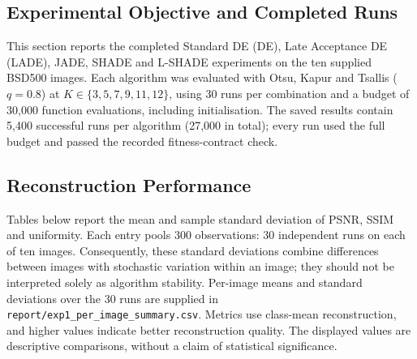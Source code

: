 \documentclass[review]{elsarticle}
\begin{document}
\label{sec:experiment1}

\subsection{Experimental Objective and Completed Runs}

This section reports the completed Standard DE (DE), Late Acceptance DE (LADE), JADE, SHADE and L-SHADE experiments on the ten supplied BSD500 images. Each algorithm was evaluated with Otsu, Kapur and Tsallis ($q=0.8$) at $K\in\{3,5,7,9,11,12\}$, using 30 runs per combination and a budget of 30,000 function evaluations, including initialisation. The saved results contain 5,400 successful runs per algorithm (27,000 in total); every run used the full budget and passed the recorded fitness-contract check.

\subsection{Reconstruction Performance}

Tables below report the mean and sample standard deviation of PSNR, SSIM and uniformity. Each entry pools 300 observations: 30 independent runs on each of ten images. Consequently, these standard deviations combine differences between images with stochastic variation within an image; they should not be interpreted solely as algorithm stability. Per-image means and standard deviations over the 30 runs are supplied in \texttt{report/exp1\_per\_image\_summary.csv}. Metrics use class-mean reconstruction, and higher values indicate better reconstruction quality. The displayed values are descriptive comparisons, without a claim of statistical significance.

\begin{table}[htbp]
\centering
\small
\caption{PSNR (dB) on BSD500 using Otsu: pooled mean $\pm$ sample standard deviation across 300 observations per entry (10 images, 30 runs each).}
\label{tab:bsd-otsu-psnr}
\end{table}
\end{document}
